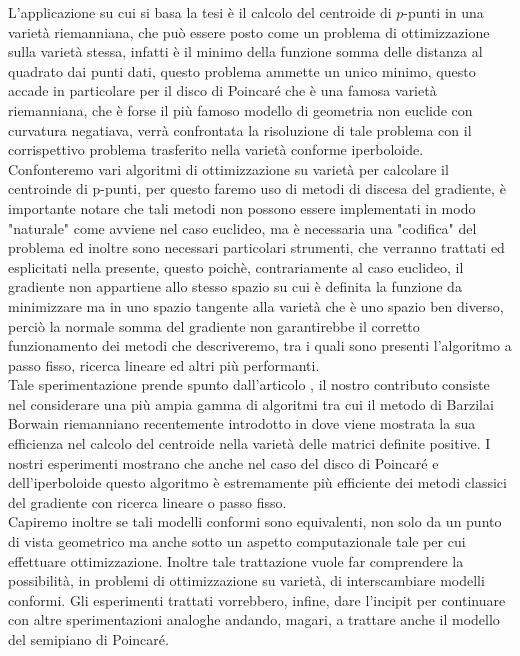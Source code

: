 \documentclass[a4paper, 12pt]{article}
\begin{document}
L'applicazione su cui si basa la tesi è il calcolo del centroide di $p$-punti in una varietà riemanniana, che può essere posto come un problema di ottimizzazione sulla varietà stessa, infatti è il minimo della funzione somma delle distanza al quadrato dai punti dati, questo problema ammette un unico minimo, questo accade in particolare per il disco di Poincaré che è una famosa varietà riemanniana, che è forse il più famoso modello di geometria non euclide con curvatura negatiava, verrà confrontata la risoluzione di tale problema con il corrispettivo problema trasferito nella varietà conforme iperboloide. Confonteremo vari algoritmi di ottimizzazione su varietà per calcolare il centroinde di p-punti, per questo faremo uso di metodi di discesa del gradiente, è importante notare che tali metodi non possono essere implementati in modo "naturale" come avviene nel caso euclideo, ma è necessaria una "codifica" del problema ed inoltre sono necessari particolari strumenti, che verranno trattati ed esplicitati nella presente, questo poichè, contrariamente al caso euclideo, il gradiente non appartiene allo stesso spazio su cui è definita la funzione da minimizzare ma in uno spazio tangente alla varietà che è uno spazio ben diverso, perciò la normale somma del gradiente non garantirebbe il corretto funzionamento dei metodi che descriveremo, tra i quali sono presenti l'algoritmo a passo fisso, ricerca lineare ed altri più performanti.\\
Tale sperimentazione prende spunto dall'articolo \cite{Wilson}, il nostro contributo consiste nel considerare una più ampia gamma di algoritmi tra cui il metodo di Barzilai Borwain riemanniano recentemente introdotto in \cite{Iannazzo} dove viene mostrata la sua efficienza nel calcolo del centroide nella varietà delle matrici definite positive. I nostri esperimenti mostrano che anche nel caso del disco di Poincaré e dell'iperboloide questo algoritmo è estremamente più efficiente dei metodi classici del gradiente con ricerca lineare o passo fisso.\\
Capiremo inoltre se tali modelli conformi sono equivalenti, non solo da un punto di vista geometrico ma anche sotto un aspetto computazionale tale per cui effettuare ottimizzazione. Inoltre tale trattazione vuole far comprendere la possibilità, in problemi di ottimizzazione su varietà, di interscambiare modelli conformi. Gli esperimenti trattati vorrebbero, infine, dare l'incipit per continuare con altre sperimentazioni analoghe andando, magari, a trattare anche il modello del semipiano di Poincaré.
\end{document}
